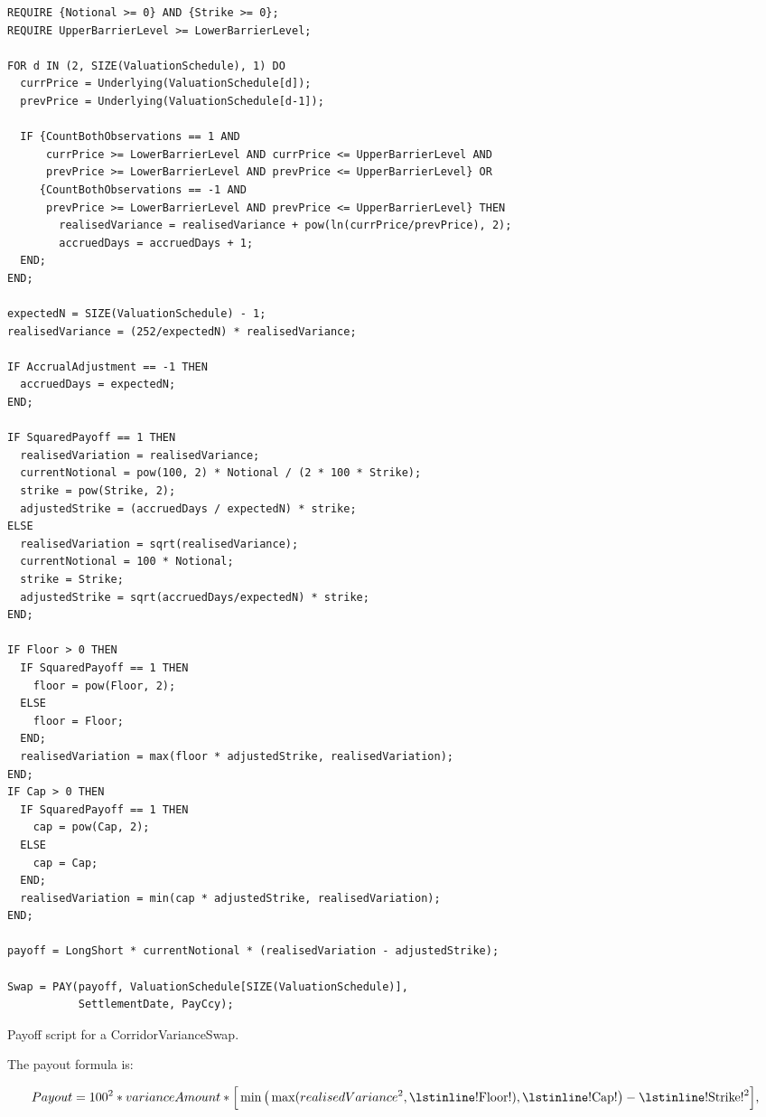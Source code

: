 \begin{listing}[hbt]
\begin{verbatim}
REQUIRE {Notional >= 0} AND {Strike >= 0};
REQUIRE UpperBarrierLevel >= LowerBarrierLevel;

FOR d IN (2, SIZE(ValuationSchedule), 1) DO
  currPrice = Underlying(ValuationSchedule[d]);
  prevPrice = Underlying(ValuationSchedule[d-1]);

  IF {CountBothObservations == 1 AND 
      currPrice >= LowerBarrierLevel AND currPrice <= UpperBarrierLevel AND
      prevPrice >= LowerBarrierLevel AND prevPrice <= UpperBarrierLevel} OR
     {CountBothObservations == -1 AND
      prevPrice >= LowerBarrierLevel AND prevPrice <= UpperBarrierLevel} THEN
        realisedVariance = realisedVariance + pow(ln(currPrice/prevPrice), 2);
        accruedDays = accruedDays + 1;
  END;
END;

expectedN = SIZE(ValuationSchedule) - 1;
realisedVariance = (252/expectedN) * realisedVariance;

IF AccrualAdjustment == -1 THEN
  accruedDays = expectedN;
END;

IF SquaredPayoff == 1 THEN
  realisedVariation = realisedVariance;
  currentNotional = pow(100, 2) * Notional / (2 * 100 * Strike);
  strike = pow(Strike, 2);
  adjustedStrike = (accruedDays / expectedN) * strike;
ELSE
  realisedVariation = sqrt(realisedVariance);
  currentNotional = 100 * Notional;
  strike = Strike;
  adjustedStrike = sqrt(accruedDays/expectedN) * strike;
END;

IF Floor > 0 THEN
  IF SquaredPayoff == 1 THEN
    floor = pow(Floor, 2);
  ELSE
    floor = Floor;
  END;
  realisedVariation = max(floor * adjustedStrike, realisedVariation);
END;
IF Cap > 0 THEN
  IF SquaredPayoff == 1 THEN
    cap = pow(Cap, 2);
  ELSE
    cap = Cap;
  END;
  realisedVariation = min(cap * adjustedStrike, realisedVariation);
END;

payoff = LongShort * currentNotional * (realisedVariation - adjustedStrike);

Swap = PAY(payoff, ValuationSchedule[SIZE(ValuationSchedule)],
           SettlementDate, PayCcy);
\end{verbatim}
\caption{Payoff script for a CorridorVarianceSwap.}
\label{lst:corridor_variance_swap}
\end{listing}

The payout formula is:

\begin{equation*}
  Payout = 100^2 * varianceAmount * \Big[ \min \big( \max (realisedVariance^2, \text{\lstinline!Floor!}), \text{\lstinline!Cap!}\big) - \text{\lstinline!Strike!}^2 \Big],
\end{equation*}

